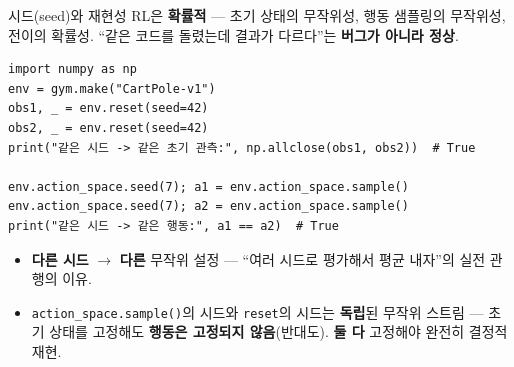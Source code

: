 \begin{frame}[fragile]{시드(seed)와 재현성}
  RL은 \textbf{확률적} --- 초기 상태의 무작위성, 행동 샘플링의
  무작위성, 전이의 확률성. ``같은 코드를 돌렸는데 결과가 다르다''는
  \textbf{버그가 아니라 정상}.
\begin{lstlisting}
import numpy as np
env = gym.make("CartPole-v1")
obs1, _ = env.reset(seed=42)
obs2, _ = env.reset(seed=42)
print("같은 시드 -> 같은 초기 관측:", np.allclose(obs1, obs2))  # True

env.action_space.seed(7); a1 = env.action_space.sample()
env.action_space.seed(7); a2 = env.action_space.sample()
print("같은 시드 -> 같은 행동:", a1 == a2)  # True
\end{lstlisting}
  \begin{itemize}
    \item \textbf{다른 시드} $\to$ \textbf{다른} 무작위 설정 ---
      ``여러 시드로 평가해서 평균 내자''의 실전 관행의 이유.
    \item \texttt{action\_space.sample()}의 시드와
      \texttt{reset}의 시드는 \textbf{독립}된 무작위 스트림 ---
      초기 상태를 고정해도 \textbf{행동은 고정되지 않음}(반대도).
      \textbf{둘 다} 고정해야 완전히 결정적 재현.
  \end{itemize}
\end{frame}
